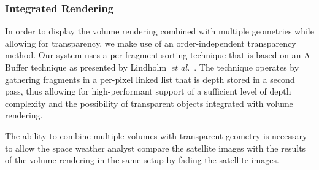 \documentclass[journal]{vgtc}                %
\def\etal{\textit{et al.}}
\def\etal{\textit{et al.}}
\begin{document}
\subsubsection{Integrated Rendering} \label{sec:integration}
In order to display the volume rendering combined with multiple geometries while allowing for transparency, we make use of an order-independent transparency method. Our system uses a per-fragment sorting technique that is based on an A-Buffer technique as presented by Lindholm~\etal~\cite{Lindholm:2014fm}. The technique operates by gathering fragments in a per-pixel linked list that is depth stored in a second pass, thus allowing for high-performant support of a sufficient level of depth complexity and the possibility of transparent objects integrated with volume rendering. 

The ability to combine multiple volumes with transparent geometry is necessary to allow the space weather analyst compare the satellite images with the results of the volume rendering in the same setup by fading the satellite images.
\end{document}
